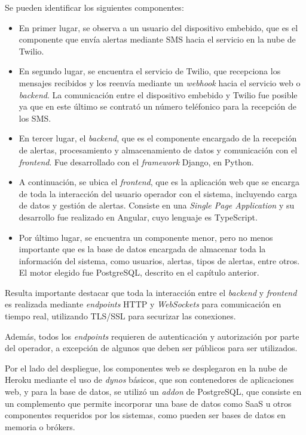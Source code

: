 {Se pueden identificar los siguientes componentes:
\begin{itemize}
	\item En primer lugar, se observa a un usuario del dispositivo embebido, que es el componente que envía alertas mediante SMS hacia el servicio en la nube de Twilio.
	\item En segundo lugar, se encuentra el servicio de Twilio, que recepciona los mensajes recibidos y los reenvía mediante un \textit{webhook} hacia el servicio web o \textit{backend}. La comunicación entre el dispositivo embebido y Twilio fue posible ya que en este último se contrató un número teléfonico para la recepción de los SMS. 
	\item En tercer lugar, el \textit{backend}, que es el componente encargado de la recepción de alertas, procesamiento y almacenamiento de datos y comunicación con el \textit{frontend}. Fue desarrollado con el \textit{framework} Django, en Python.
	\item A continuación, se ubica el \textit{frontend}, que es la aplicación web que se encarga de toda la interacción del usuario operador con el sistema, incluyendo carga de datos y gestión de alertas. Consiste en una \textit{Single Page Application } y su desarrollo fue realizado en Angular, cuyo lenguaje es TypeScript.
	\item Por último lugar, se encuentra un componente menor, pero no menos importante que es la base de datos encargada de almacenar toda la información del sistema, como usuarios, alertas, tipos de alertas, entre otros. El motor elegido fue PostgreSQL, descrito en el capítulo anterior.
\end{itemize}
   
Resulta importante destacar que toda la interacción entre el \textit{backend} y \textit{frontend} es realizada mediante \textit{endpoints} HTTP y \textit{WebSockets} para comunicación en tiempo real, utilizando TLS/SSL para securizar las conexiones. 

Además, todos los \textit{endpoints} requieren de autenticación y autorización por parte del operador, a excepción de algunos que deben ser públicos para ser utilizados.

Por el lado del despliegue, los componentes web se desplegaron en la nube de Heroku mediante el uso de \textit{dynos} básicos, que son contenedores de aplicaciones web\citep{HEROKU:1}, y para la base de datos, se utilizó un \textit{addon} de PostgreSQL, que consiste en un complemento que permite incorporar una base de datos como SaaS u otros componentes requeridos por los sistemas, como pueden ser bases de datos en memoria o brókers\citep{HEROKU:2}.

}
